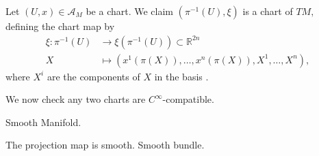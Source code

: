 Let \((U, x) \in \mathscr{A}_M\) be a chart. We claim \(\left(\pi^{-1}(U), \xi\right)\) is a chart of \(TM,\) defining the chart map by
\begin{align*}
    \xi : \pi^{-1}(U) &\to \xi\left(\pi^{-1}(U)\right) \subset \mathbb{R}^{2n}\\
               X &\mapsto \left(x^1(\pi(X)), \dots, x^n(\pi(X)),X^1, \dots, X^n\right),
\end{align*}
where \(X^i\) are the components of \(X\) in the basis .

We now check any two charts are \(C^\infty\)-compatible.

Smooth Manifold.

The projection map is smooth. Smooth bundle.
